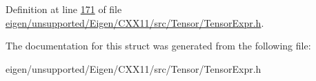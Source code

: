 Definition at line \hyperlink{eigen_2unsupported_2_eigen_2_c_x_x11_2src_2_tensor_2_tensor_expr_8h_source_l00171}{171} of file \hyperlink{eigen_2unsupported_2_eigen_2_c_x_x11_2src_2_tensor_2_tensor_expr_8h_source}{eigen/unsupported/\+Eigen/\+C\+X\+X11/src/\+Tensor/\+Tensor\+Expr.\+h}.



The documentation for this struct was generated from the following file\+:\begin{DoxyCompactItemize}
\item 
eigen/unsupported/\+Eigen/\+C\+X\+X11/src/\+Tensor/\+Tensor\+Expr.\+h\end{DoxyCompactItemize}
